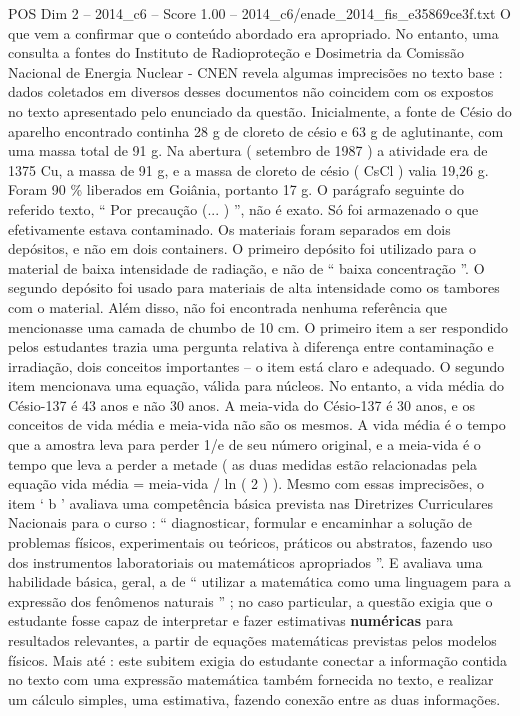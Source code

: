 \begin{textsample}{POS Dim 2 – 2014\_c6 – Score 1.00 – 2014\_c6/enade\_2014\_fis\_e35869ce3f.txt}
O que vem a confirmar que o conteúdo abordado era apropriado.
No entanto, uma consulta a fontes do Instituto de Radioproteção e Dosimetria da Comissão Nacional de Energia Nuclear - CNEN revela algumas imprecisões no texto base : dados coletados em diversos desses documentos não coincidem com os expostos no texto apresentado pelo enunciado da questão.
Inicialmente, a fonte de Césio do aparelho encontrado continha 28 g de cloreto de césio e 63 g de aglutinante, com uma massa total de 91 g.
Na abertura ( setembro de 1987 ) a atividade era de 1375 Cu, a massa de 91 g, e a massa de cloreto de césio ( CsCl ) valia 19,26 g.
Foram 90 \% liberados em Goiânia, portanto 17 g.
O parágrafo seguinte do referido texto, “ Por precaução (... ) ”, não é exato.
Só foi armazenado o que efetivamente estava contaminado.
Os materiais foram separados em dois depósitos, e não em dois containers.
O primeiro depósito foi utilizado para o material de baixa intensidade de radiação, e não de “ baixa concentração ”.
O segundo depósito foi usado para materiais de alta intensidade como os tambores com o material.
Além disso, não foi encontrada nenhuma referência que mencionasse uma camada de chumbo de 10 cm.
O primeiro item a ser respondido pelos estudantes trazia uma pergunta relativa à diferença entre contaminação e irradiação, dois conceitos importantes – o item está claro e adequado.
O segundo item mencionava uma equação, válida para núcleos.
No entanto, a vida média do Césio-137 é 43 anos e não 30 anos.
A meia-vida do Césio-137 é 30 anos, e os conceitos de vida média e meia-vida não são os mesmos.
A vida média é o tempo que a amostra leva para perder 1/e de seu número original, e a meia-vida é o tempo que leva a perder a metade ( as duas medidas estão relacionadas pela equação vida média = meia-vida / ln ( 2 ) ).
Mesmo com essas imprecisões, o item ‘ b ’ avaliava uma competência básica prevista nas Diretrizes Curriculares Nacionais para o curso : “ diagnosticar, formular e encaminhar a solução de problemas físicos, experimentais ou teóricos, práticos ou abstratos, fazendo uso dos instrumentos laboratoriais ou matemáticos apropriados ”.
E avaliava uma habilidade básica, geral, a de “ utilizar a matemática como uma linguagem para a expressão dos fenômenos naturais ” ; no caso particular, a questão exigia que o estudante fosse capaz de interpretar e fazer estimativas \textbf{numéricas} para resultados relevantes, a partir de equações matemáticas previstas pelos modelos físicos.
Mais até : este subitem exigia do estudante conectar a informação contida no texto com uma expressão matemática também fornecida no texto, e realizar um cálculo simples, uma estimativa, fazendo conexão entre as duas informações.

\end{textsample}
